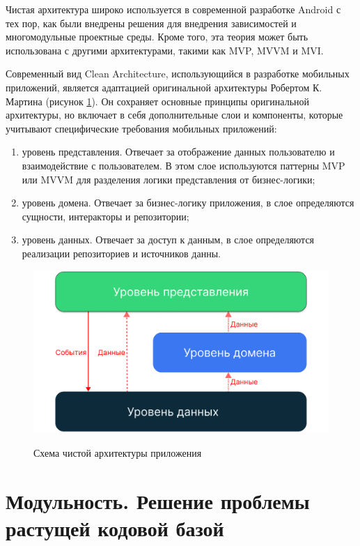Чистая архитектура широко используется в современной разработке Android с тех пор, как были внедрены решения для внедрения зависимостей и многомодульные проектные среды. Кроме того, эта теория может быть использована с другими архитектурами, такими как MVP, MVVM и MVI.

Современный вид Clean Architecture, использующийся в разработке мобильных приложений, является адаптацией оригинальной архитектуры Робертом К. Мартина (рисунок \ref{fig:CleanArchNEW}). Он сохраняет основные принципы оригинальной архитектуры, но включает в себя дополнительные слои и компоненты, которые учитывают специфические требования мобильных приложений:
\begin{enumerate}
    \item уровень представления. Отвечает за отображение данных пользователю и взаимодействие с пользователем. В этом слое используются паттерны MVP или MVVM для разделения логики представления от бизнес-логики;
    \item уровень домена. Отвечает за бизнес-логику приложения, в слое определяются сущности, интеракторы и репозитории;
    \item уровень данных. Отвечает за доступ к данным, в слое определяются реализации репозиториев и источников данны.
\end{enumerate}

\begin{figure}[h!]
    \begin{center}
        \includegraphics[width=0.65\hsize]{fig/CleanArchNEW.png}\\[2mm]
        \caption{Схема чистой архитектуры приложения}\label{fig:CleanArchNEW}
    \end{center}
\end{figure}




\section{Модульность. Решение проблемы растущей кодовой базой}

